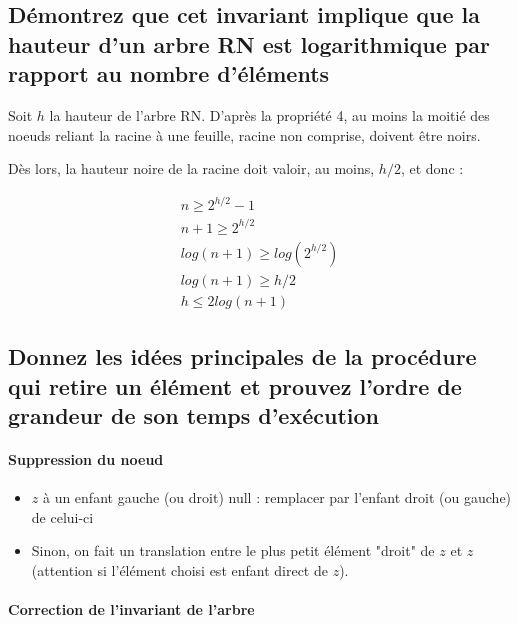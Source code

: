 \documentclass[11pt]{article}
\begin{document}
\subsection{Démontrez que cet invariant implique que la hauteur d'un arbre RN est logarithmique par rapport au nombre d'éléments}

Soit $h$ la hauteur de l'arbre RN. D'après la propriété 4, au moins la moitié des noeuds reliant la racine à une feuille, racine non comprise, doivent être noirs.

Dès lors, la hauteur noire de la racine doit valoir, au moins, $h/2$, et donc :

\begin{equation}
	\begin{split}
		n \geq 2^{h/2} - 1\\
		n + 1 \geq 2^{h/2}\\
		log(n + 1) \geq log(2^{h/2})\\
		log(n + 1) \geq h/2\\
		h \leq 2 log(n + 1) 
	\end{split}
\end{equation}

\subsection{Donnez les idées principales de la procédure qui retire un élément et prouvez l'ordre de grandeur de son temps d'exécution}

\paragraph{Suppression du noeud}

\begin{itemize}
	\item $z$ à un enfant gauche (ou droit) null : remplacer par l'enfant droit (ou gauche) de celui-ci
	\item Sinon, on fait un translation entre le plus petit élément "droit" de $z$ et $z$ (attention si l'élément choisi est enfant direct de $z$).
\end{itemize}

\paragraph{Correction de l'invariant de l'arbre}
\end{document}
